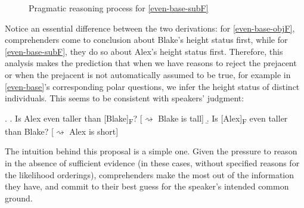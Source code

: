 \documentclass[12pt,letterpaper]{scrartcl}
\newcommand{\alignright}{\hspace*{\fill}}
\newcommand{\infer}{$\rightsquigarrow$ }
\newcommand{\sub}[1]{\textsubscript{#1}}
\begin{document}
\begin{figure}[h]
  \vspace{0.25cm}
  \begin{center}
  \end{center}
  \caption{Pragmatic reasoning process for \ref{even-base-subF}}
\end{figure}

Notice an essential difference between the two derivations: for \ref{even-base-objF}, comprehenders come to conclusion about Blake's height status first, while for \ref{even-base-subF}, they do so about Alex's height status first. Therefore, this analysis makes the prediction that when we have reasons to reject the prejacent or when the prejacent is not automatically assumed to be true, for example in \ref{even-base}'s corresponding polar questions, we infer the height status of distinct individuals. This seems to be consistent with speakers' judgment:

\ex. \a. Is Alex even taller than [Blake]\sub{F}? \alignright [\infer Blake is tall]
\b. Is [Alex]\sub{F} even taller than Blake? \alignright [\infer Alex is short]


The intuition behind this proposal is a simple one. Given the pressure to reason in the absence of sufficient evidence (in these cases, without specified reasons for the likelihood orderings), comprehenders make the most out of the information they have, and commit to their best guess for the speaker's intended common ground.
\end{document}
